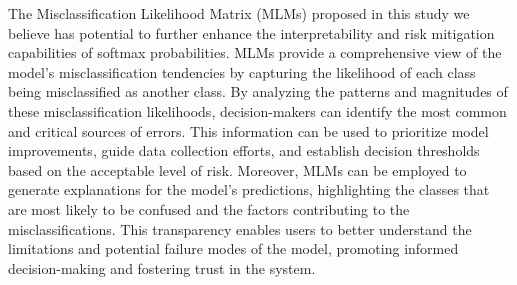 The Misclassification Likelihood Matrix (MLMs) proposed in this study we believe has potential to further enhance the interpretability and risk mitigation capabilities of softmax probabilities. MLMs provide a comprehensive view of the model's misclassification tendencies by capturing the likelihood of each class being misclassified as another class. By analyzing the patterns and magnitudes of these misclassification likelihoods, decision-makers can identify the most common and critical sources of errors. This information can be used to prioritize model improvements, guide data collection efforts, and establish decision thresholds based on the acceptable level of risk. Moreover, MLMs can be employed to generate explanations for the model's predictions, highlighting the classes that are most likely to be confused and the factors contributing to the misclassifications. This transparency enables users to better understand the limitations and potential failure modes of the model, promoting informed decision-making and fostering trust in the system.





